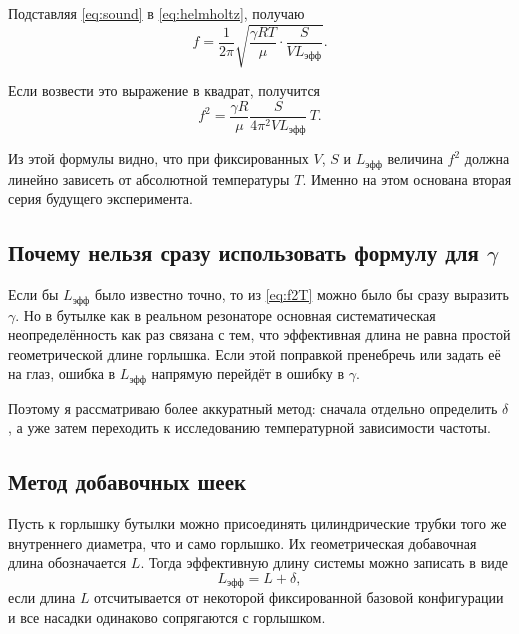 \documentclass[a4paper,12pt]{article}
\begin{document}
	Подставляя \eqref{eq:sound} в \eqref{eq:helmholtz}, получаю
	\begin{equation}
		f=\frac{1}{2\pi}\sqrt{
			\frac{\gamma RT}{\mu}\cdot
			\frac{S}{V L_{\text{эфф}}}
		}.
		\label{eq:f_gamma}
	\end{equation}
	
	Если возвести это выражение в квадрат, получится
	\begin{equation}
		f^2=
		\frac{\gamma R}{\mu}
		\frac{S}{4\pi^2 V L_{\text{эфф}}}
		\,T.
		\label{eq:f2T}
	\end{equation}
	
	Из этой формулы видно, что при фиксированных \(V\), \(S\) и \(L_{\text{эфф}}\) величина \(f^2\) должна линейно зависеть от абсолютной температуры \(T\). Именно на этом основана вторая серия будущего эксперимента.
	
	\subsection{Почему нельзя сразу использовать формулу для \(\gamma\)}
	
	Если бы \(L_{\text{эфф}}\) было известно точно, то из \eqref{eq:f2T} можно было бы сразу выразить \(\gamma\). Но в бутылке как в реальном резонаторе основная систематическая неопределённость как раз связана с тем, что эффективная длина не равна простой геометрической длине горлышка. Если этой поправкой пренебречь или задать её на глаз, ошибка в \(L_{\text{эфф}}\) напрямую перейдёт в ошибку в \(\gamma\).
	
	Поэтому я рассматриваю более аккуратный метод: сначала отдельно определить \(\delta\), а уже затем переходить к исследованию температурной зависимости частоты.
	
	\subsection{Метод добавочных шеек}
	
	Пусть к горлышку бутылки можно присоединять цилиндрические трубки того же внутреннего диаметра, что и само горлышко. Их геометрическая добавочная длина обозначается \(L\). Тогда эффективную длину системы можно записать в виде
	\begin{equation}
		L_{\text{эфф}}=L+\delta,
		\label{eq:addL}
	\end{equation}
	если длина \(L\) отсчитывается от некоторой фиксированной базовой конфигурации и все насадки одинаково сопрягаются с горлышком.
	
\end{document}
